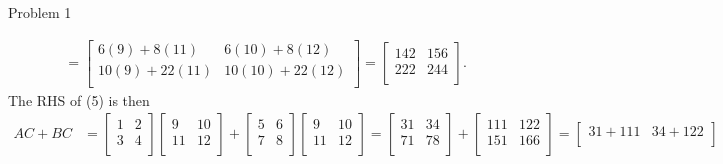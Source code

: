 \begin{problem}{Problem 1}
\begin{highlight}[Solution]
\begin{align*}
            & = 
            \begin{bmatrix}
                6(9) + 8(11) & 6(10) + 8(12) \\
                10(9) + 22(11) & 10(10) + 22(12) \\
            \end{bmatrix}
            = 
            \begin{bmatrix}
                142 & 156 \\
                222 & 244 \\
            \end{bmatrix}.
        \end{align*}
        The RHS of (5) is then
        \begin{align*}
            AC + BC & = 
            \begin{bmatrix}
                1 & 2 \\
                3 & 4 \\
            \end{bmatrix}
            \begin{bmatrix}
                9 & 10 \\
                11 & 12 \\
            \end{bmatrix}
            +
            \begin{bmatrix}
                5 & 6 \\
                7 & 8 \\
            \end{bmatrix}
            \begin{bmatrix}
                9 & 10 \\
                11 & 12 \\
            \end{bmatrix}
            = 
            \begin{bmatrix}
                31 & 34 \\
                71 & 78 \\
            \end{bmatrix}
            + 
            \begin{bmatrix}
                111 & 122 \\
                151 & 166 \\
            \end{bmatrix}
            = 
            \begin{bmatrix}
                31 + 111 & 34 + 122 \\

\end{bmatrix}
\end{align*}
\end{highlight}
\end{problem}
